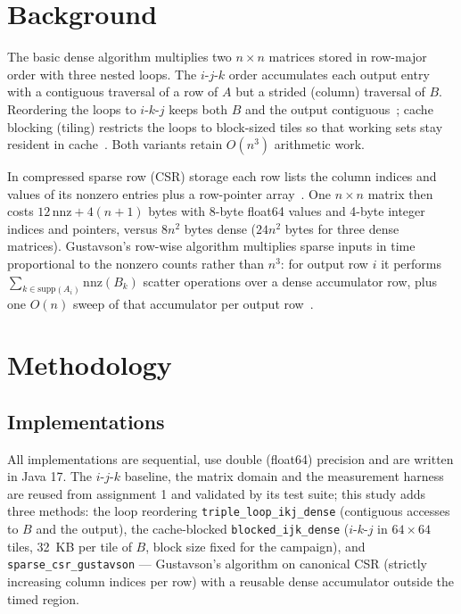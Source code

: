 \documentclass[11pt,a4paper]{article}
\begin{document}
\section{Background}
\label{sec:background}

The basic dense algorithm multiplies two $n \times n$ matrices stored in
row-major order with three nested loops. The $i$-$j$-$k$ order accumulates
each output entry with a contiguous traversal of a row of $A$ but a strided
(column) traversal of $B$. Reordering the loops to $i$-$k$-$j$ keeps both
$B$ and the output contiguous~\cite{higham2002}; cache blocking (tiling)
restricts the loops to block-sized tiles so that working sets stay resident
in cache~\cite{lam1991}. Both variants retain $O(n^3)$ arithmetic work.

In compressed sparse row (CSR) storage each row lists the column indices and
values of its nonzero entries plus a row-pointer
array~\cite{saad2003}. One $n \times n$ matrix then costs
$12\,\mathrm{nnz} + 4(n+1)$ bytes with 8-byte float64 values and 4-byte
integer indices and pointers, versus $8n^2$ bytes dense ($24n^2$ bytes for
three dense matrices). Gustavson's row-wise algorithm multiplies sparse
inputs in time proportional to the nonzero counts rather than $n^3$: for
output row $i$ it performs
$\sum_{k \in \mathrm{supp}(A_i)} \mathrm{nnz}(B_k)$ scatter operations over
a dense accumulator row, plus one $O(n)$ sweep of that accumulator per output
row~\cite{gustavson1978}.

\section{Methodology}
\label{sec:methodology}

\subsection{Implementations}

All implementations are sequential, use double (float64) precision and are
written in Java 17. The $i$-$j$-$k$ baseline, the matrix domain and the
measurement harness are reused from assignment 1 and validated by its test
suite; this study adds three methods: the loop reordering
\texttt{triple\_loop\_ikj\_dense} (contiguous accesses to $B$ and the
output), the cache-blocked \texttt{blocked\_ijk\_dense} ($i$-$k$-$j$ in
$64 \times 64$ tiles, 32~KB per tile of $B$, block size fixed for the
campaign), and \texttt{sparse\_csr\_gustavson} --- Gustavson's algorithm on
canonical CSR (strictly increasing column indices per row) with a reusable
dense accumulator outside the timed region.
\end{document}
